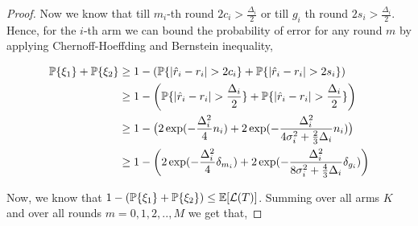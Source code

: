 \begin{proof}
Now we know that till $m_i$-th round $2c_i > \frac{\Delta_i}{2}$  or till $g_i$ th round $2s_i > \frac{\Delta_i}{2}$. Hence, for the $i$-th arm we can bound the probability of error for any round $m$ by applying Chernoff-Hoeffding and Bernstein inequality,
\begin{small}
\begin{align*}
 \mathbb{P}\lbrace \xi_1\rbrace  + \mathbb{P}\lbrace \xi_2 \rbrace &\geq 1-(\mathbb{P}\lbrace |\hat{r}_i -r_i| > 2c_i \rbrace + \mathbb{P}\lbrace |\hat{r}_i -r_i| > 2s_i \rbrace)\\ 
&\geq 1-\left(\mathbb{P}\lbrace |\hat{r}_i - r_i| > \frac{\Delta_i}{2} \rbrace + \mathbb{P}\lbrace |\hat{r}_i - r_i| > \frac{\Delta_i}{2} \rbrace\right) \\
&\geq 1-\big(2\exp( -\frac{\Delta_{i}^{2}}{4}n_i ) + 2\exp(- \frac{\Delta_{i}^{2}}{4\sigma_{i}^{2}+ \frac{2}{3}\Delta_i}n_i)\big)\\
&\geq 1-\bigg(2\exp( -\frac{\Delta_{i}^{2}}{4}\delta_{m_{i}} ) + 2\exp(- \frac{\Delta_{i}^{2}}{8\sigma_{i}^{2}+ \frac{4}{3}\Delta_i}\delta_{g_{i}})\bigg)
\end{align*}
\end{small}
Now, we know that $1- (\mathbb{P}\lbrace \xi_1\rbrace  + \mathbb{P}\lbrace \xi_2 \rbrace)\leq \mathbb{E}[\mathcal{L}(T)]$. Summing over all arms $K$ and over all rounds $m=0,1,2,..,M$ we get that,

\end{proof}
